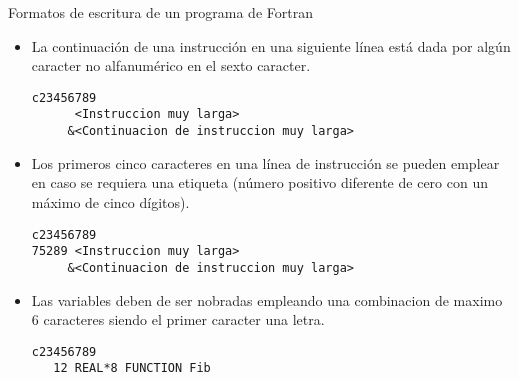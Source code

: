 \begin{frame}[fragile]{Formatos de escritura de un programa de Fortran}
   \begin{itemize}[<+(0)->]
   \item La continuación de una instrucción en una siguiente línea está dada por algún caracter no alfanumérico en el sexto caracter.
    \begin{verbatim} 
c23456789
      <Instruccion muy larga>
     &<Continuacion de instruccion muy larga>
    \end{verbatim}
   \item Los primeros cinco caracteres en una línea de instrucción se pueden emplear en caso se requiera una etiqueta (número positivo diferente de cero con un máximo de cinco dígitos).
    \begin{verbatim} 
c23456789
75289 <Instruccion muy larga>
     &<Continuacion de instruccion muy larga>
    \end{verbatim}
   \item Las variables deben de ser nobradas empleando una combinacion de maximo 6 caracteres siendo el primer caracter una letra.
    \begin{verbatim} 
c23456789
   12 REAL*8 FUNCTION Fib
    \end{verbatim}
  \end{itemize}
\end{frame}
